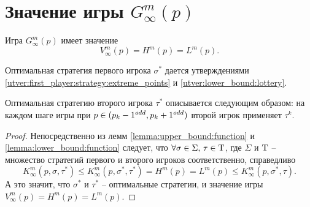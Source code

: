 \section{Значение игры $ G_\infty^m(p) $}
\begin{theorem}
\label{theorem:infinite_game:value}
Игра $ G_\infty^m(p) $ имеет значение 
\[
V_\infty^m(p) = H^m(p) = L^m(p).
\]

Оптимальная стратегия первого игрока $ \sigma^* $ дается утверждениями \ref{utver:first_player:strategy:extreme_points} и \ref{utver:lower_bound:lottery}.

Оптимальная стратегию второго игрока $ \tau^* $ описывается следующим образом: на каждом шаге игры при $ p \in (p_k-1^{odd}, p_k+1^{odd}) $ второй игрок применяет $ \tau^k $.
\end{theorem}
\begin{proof}
Непосредственно из лемм \ref{lemma:upper_bound:function} и \ref{lemma:lower_bound:function} следует, что
$ \forall \sigma \in \Sigma, \, \tau \in \mathrm{T} $, где $ \Sigma $ и $ \mathrm{T} $ -- множество стратегий первого и второго игроков соответственно, справедливо
\[
  K_\infty^m(p, \sigma, \tau^*)
\leq K_\infty^m(p, \sigma^*, \tau^*) = H^m(p) = L^m(p) \leq 
  K_\infty^m(p, \sigma^*, \tau).
\]
А это значит, что $ \sigma^* $ и $ \tau^* $ -- оптимальные стратегии, и значение игры $ V_\infty^m(p) = H^m(p) = L^m(p) $.
\end{proof}